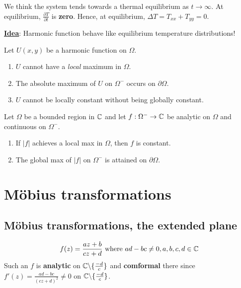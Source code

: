\documentclass[12pt]{article}
\begin{document}
We think the system tends towards a thermal equilibrium as $t\to \infty$. At equilibrium, $\frac{\partial T}{\partial t}$ is \textbf{zero}. Hence, at equilibrium, $\Delta T=T_{xx}+T_{yy}=0$.

\textbf{\underline{Idea}}: \hypertarget{physics}{Harmonic function behave like equilibrium temperature distributions!}

\begin{proposition}
    Let $U(x,y)$ be a harmonic function on $\Omega$.
    \begin{enumerate}
        \item $U$ cannot have a \textit{local} maximum in $\Omega$.
        \item The absolute maximum of $U$ on $\Omega ^-$ occurs on $\partial \Omega$.
        \item $U$ cannot be locally constant without being globally constant.
    \end{enumerate}
\end{proposition}

\begin{theorem}
    Let $\Omega$ be a bounded region in $\mathbb{C}$ and let $f: \Omega^-\to \mathbb{C}$ be analytic on $\Omega$ and continuous on $\Omega^-$.
    \begin{enumerate}
        \item If $|f|$ achieves a local max in $\Omega$, then $f$ is constant.
        \item The global max of $|f|$ on $\Omega^-$ is attained on $\partial \Omega$.
    \end{enumerate}
\end{theorem}

\section{Möbius transformations}
\subsection{Möbius transformations, the extended plane}
\begin{align*}
    f(z)=\frac{az+b}{cz+d}\text{ where } ad-bc\neq 0, a,b,c,d\in \mathbb{C}
\end{align*}
Such an $f$ is \textbf{analytic} on $\mathbb{C}\backslash\{\frac{-d}{c}\}$ and \textbf{comformal} there since $f'(z)=\frac{ad-bc}{(cz+d)^2}\neq 0$ on $\mathbb{C}\backslash\{\frac{-d}{c}\}$.
\end{document}
